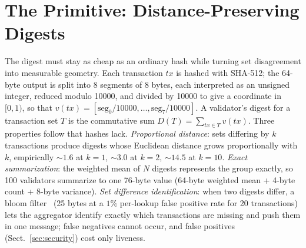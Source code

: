 \documentclass[runningheads]{llncs}
\begin{document}
\section{The Primitive: Distance-Preserving Digests}
\label{sec:primitive}

The digest must stay as cheap as an ordinary hash while turning set disagreement into measurable geometry. Each transaction $tx$ is hashed with SHA-512; the 64-byte output is split into 8 segments of 8 bytes, each interpreted as an unsigned integer, reduced modulo 10000, and divided by 10000 to give a coordinate in $[0,1)$, so that $v(tx) = [\mathrm{seg}_0/10000, \ldots, \mathrm{seg}_7/10000]$. A validator's digest for a transaction set $T$ is the commutative sum $D(T) = \sum_{tx \in T} v(tx)$. Three properties follow that hashes lack. \emph{Proportional distance}: sets differing by $k$ transactions produce digests whose Euclidean distance grows proportionally with $k$, empirically $\sim 1.6$ at $k{=}1$, $\sim 3.0$ at $k{=}2$, $\sim 14.5$ at $k{=}10$. \emph{Exact summarization}: the weighted mean of $N$ digests represents the group exactly, so 100 validators summarize to one 76-byte value (64-byte weighted mean + 4-byte count + 8-byte variance). \emph{Set difference identification}: when two digests differ, a bloom filter~\cite{bloom1970} (25 bytes at a $1\%$ per-lookup false positive rate for 20 transactions) lets the aggregator identify exactly which transactions are missing and push them in one message; false negatives cannot occur, and false positives (Sect.~\ref{sec:security}) cost only liveness.
\end{document}
